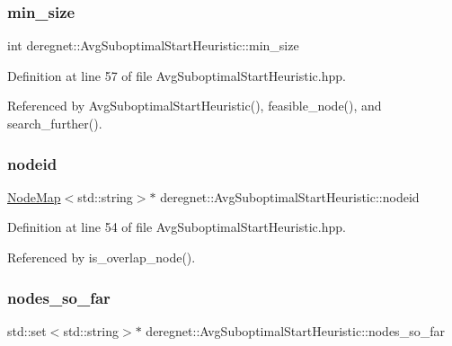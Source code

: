 \subsubsection{\texorpdfstring{min\+\_\+size}{min\_size}}
{\footnotesize\ttfamily int deregnet\+::\+Avg\+Suboptimal\+Start\+Heuristic\+::min\+\_\+size\hspace{0.3cm}{\ttfamily [private]}}



Definition at line 57 of file Avg\+Suboptimal\+Start\+Heuristic.\+hpp.



Referenced by Avg\+Suboptimal\+Start\+Heuristic(), feasible\+\_\+node(), and search\+\_\+further().

\mbox{\label{classderegnet_1_1AvgSuboptimalStartHeuristic_af59e6b6ba10fd5d2c210a0947cf37e66}} 
\subsubsection{\texorpdfstring{nodeid}{nodeid}}
{\footnotesize\ttfamily \hyperlink{namespacederegnet_ae102b707ae1d6f83c639ece5e0dd5658}{Node\+Map}$<$std\+::string$>$$\ast$ deregnet\+::\+Avg\+Suboptimal\+Start\+Heuristic\+::nodeid\hspace{0.3cm}{\ttfamily [private]}}



Definition at line 54 of file Avg\+Suboptimal\+Start\+Heuristic.\+hpp.



Referenced by is\+\_\+overlap\+\_\+node().

\mbox{\label{classderegnet_1_1AvgSuboptimalStartHeuristic_ac07c2b61bf03b25e1bd87cb353bd4597}} 
\subsubsection{\texorpdfstring{nodes\+\_\+so\+\_\+far}{nodes\_so\_far}}
{\footnotesize\ttfamily std\+::set$<$std\+::string$>$$\ast$ deregnet\+::\+Avg\+Suboptimal\+Start\+Heuristic\+::nodes\+\_\+so\+\_\+far\hspace{0.3cm}{\ttfamily [private]}}



